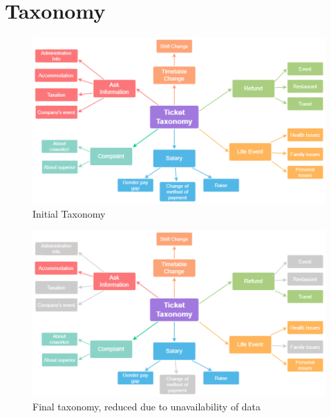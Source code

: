 \section{Taxonomy}

\begin{figure}[h] 
    \includegraphics[width=\textwidth]{images/Taxonomy_Tickets.drawio.png}
    \caption{Initial Taxonomy}
    \label{fig:taxonomy}
\end{figure}    

\begin{figure}[h] 
    \includegraphics[width=\textwidth]{images/Taxonomy_Tickets_implemented.drawio.png}
    \caption{Final taxonomy, reduced due to unavailability of data}
    \label{fig:final_taxonomy}
\end{figure}    

